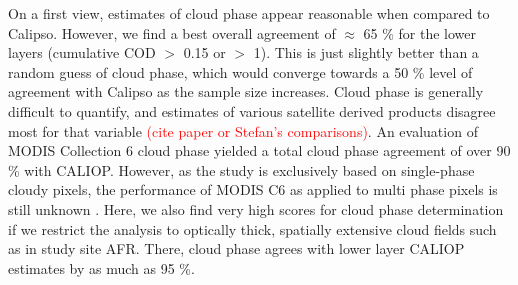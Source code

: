 On a first view, estimates of cloud phase appear reasonable when compared to Calipso. However, we find a best overall agreement of $\approx$ 65 \% for the lower layers (cumulative COD $>$ 0.15 or $>$ 1). This is just slightly better than a random guess of cloud phase, which would converge towards a 50 \% level of agreement with Calipso as the sample size increases. Cloud phase is generally difficult to quantify, and estimates of various satellite derived products disagree most for that variable \textcolor{red}{(cite paper or Stefan's comparisons)}. An evaluation of MODIS Collection 6 cloud phase yielded a total cloud phase agreement of over 90 \% with CALIOP. However, as the study is exclusively based on single-phase cloudy pixels, the performance of MODIS C6 as applied to multi phase pixels is still unknown \citep{Marchant16}. Here, we also find very high scores for cloud phase determination if we restrict the analysis to optically thick, spatially extensive cloud fields such as in study site AFR. There, cloud phase agrees with lower layer CALIOP estimates by as much as 95 \%. 

